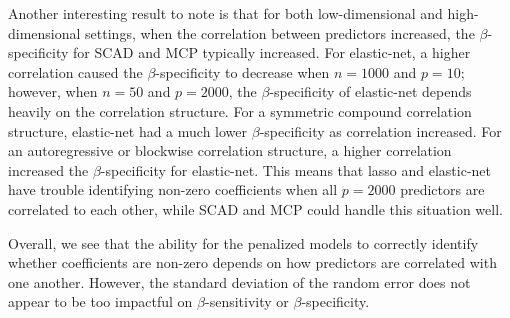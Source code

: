\documentclass{article}
\begin{document}
	Another interesting result to note is that for both low-dimensional and high-dimensional settings, when the correlation between predictors increased, the $\beta$-specificity for SCAD and MCP typically increased. For elastic-net, a higher correlation caused the $\beta$-specificity to decrease when $n = 1000$ and $p = 10$; however, when $n = 50$ and $p = 2000$, the $\beta$-specificity of elastic-net depends heavily on the correlation structure. For a symmetric compound correlation structure, elastic-net had a much lower $\beta$-specificity as correlation increased. For an autoregressive or blockwise correlation structure, a higher correlation increased the $\beta$-specificity for elastic-net. This means that lasso and elastic-net have trouble identifying non-zero coefficients when all $p = 2000$ predictors are correlated to each other, while SCAD and MCP could handle this situation well.
	
	Overall, we see that the ability for the penalized models to correctly identify whether coefficients are non-zero depends on how predictors are correlated with one another. However, the standard deviation of the random error does not appear to be too impactful on $\beta$-sensitivity or $\beta$-specificity.
	
	
\end{document}
